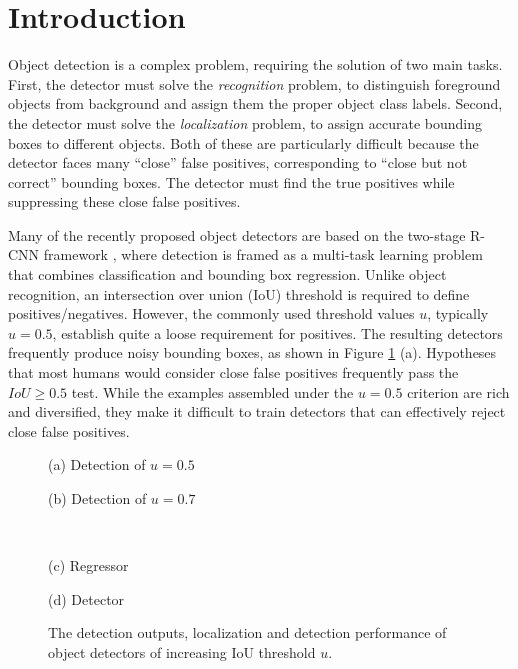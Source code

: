 \documentclass[10pt,twocolumn,letterpaper]{article}
\begin{document}
\section{Introduction}
\label{sec:intro}

Object detection is a complex problem, requiring the solution of two main tasks. First, the detector must solve the {\it recognition\/} problem, to distinguish foreground objects from background and assign them the proper object class labels. Second, the detector must solve the {\it localization\/} problem, to assign accurate bounding boxes to different objects. Both of these are particularly difficult because the detector faces many ``close'' false positives, corresponding to ``close but not correct'' bounding boxes. The detector must find the true positives while suppressing these close false positives.

Many of the recently proposed object detectors are based on the
two-stage R-CNN framework \cite{DBLP:conf/cvpr/GirshickDDM14,DBLP:conf/iccv/Girshick15,DBLP:conf/nips/RenHGS15,lin2017feature}, where detection is framed
as a multi-task learning problem that combines classification and bounding
box regression. Unlike object recognition, an intersection over union (IoU)
threshold is required to define positives/negatives. However, the commonly used threshold values $u$, typically $u=0.5$, establish quite a loose
requirement for positives. The resulting detectors frequently produce noisy
bounding boxes, as shown in Figure \ref{fig:motivation} (a). Hypotheses
that most humans would consider close false positives frequently pass the $IoU \geq 0.5$ test. While the examples assembled under the $u=0.5$ criterion are
rich and diversified, they make it difficult to train detectors that can
effectively reject close false positives.


\begin{figure}[!t]
\begin{minipage}[b]{.495\linewidth}
\centering
\centerline{}{(a) Detection of $u=0.5$}
\end{minipage}
\hfill
\begin{minipage}[b]{.495\linewidth}
\centering
\centerline{}{(b) Detection of $u=0.7$}
\end{minipage}\\
\hfill
\begin{minipage}[b]{.48\linewidth}
\centering
\centerline{}{(c) Regressor}
\end{minipage}
\hfill
\begin{minipage}[b]{.48\linewidth}
\centering
\centerline{}{(d) Detector}
\end{minipage}
\caption{The detection outputs, localization and detection performance of object detectors of increasing IoU threshold $u$.}
\label{fig:motivation}
\end{figure}
\end{document}
